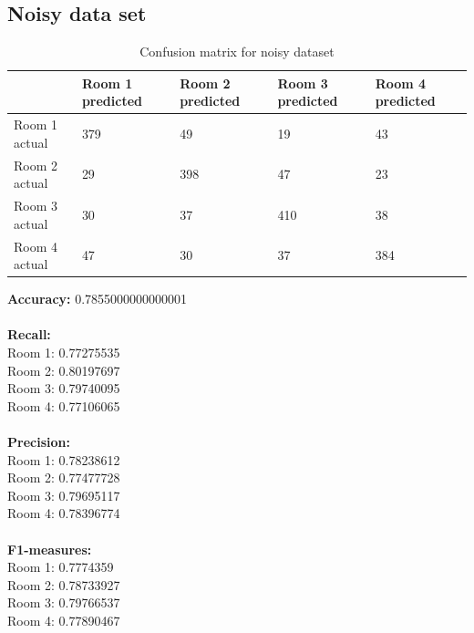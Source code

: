 \documentclass[a4paper, 11pt]{article}
\begin{document}
    \subsection{Noisy data set}
    \renewcommand{\arraystretch}{2}  
    \begin{table}[htb]
      \centering
      \caption{Confusion matrix for noisy dataset}
      \begin{tabular}{|l|l|l|l|l|}
      \hline
                    & Room 1 predicted & Room 2 predicted & Room 3 predicted & Room 4 predicted \\ \hline
      Room 1 actual & 379              & 49               & 19               & 43               \\ \hline
      Room 2 actual & 29               & 398              & 47               & 23               \\ \hline
      Room 3 actual & 30               & 37               & 410              & 38               \\ \hline
      Room 4 actual & 47               & 30               & 37               & 384              \\ \hline
      \end{tabular}
    \end{table}
    \textbf{Accuracy:} 0.7855000000000001 \\
    \\
    \textbf{Recall:} \\
    Room 1: 0.77275535 \\
    Room 2: 0.80197697 \\
    Room 3: 0.79740095 \\
    Room 4: 0.77106065 \\
    \\
    \textbf{Precision:} \\
    Room 1: 0.78238612 \\
    Room 2: 0.77477728 \\
    Room 3: 0.79695117 \\
    Room 4: 0.78396774 \\
    \\
    \textbf{F1-measures:} \\
    Room 1: 0.7774359 \\
    Room 2: 0.78733927  \\
    Room 3: 0.79766537 \\
    Room 4: 0.77890467 \\
    
\pagebreak
\end{document}
